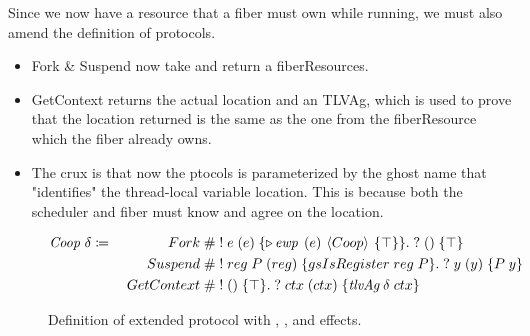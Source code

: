 Since we now have a resource that a fiber must own while running, we must also amend the definition of protocols.

\begin{itemize}
  \item Fork \& Suspend now take and return a fiberResources.
  \item GetContext returns the actual location and an TLVAg, which is used to prove that the location returned is the same as the one from the fiberResource
        which the fiber already owns.
  \item The crux is that now the ptocols \protod{} is parameterized by the ghost name that "identifies" the thread-local variable location.
        This is because both the scheduler and fiber must know and agree on the location. 
\end{itemize}

\begin{figure}[ht]
  \begin{alignat*}{2}
    \protod{} \coloneqq\; &  & \quad Fork\; \#    & \; !\; e\; (e)\; \{\later \ewp{e}{Coop}{\top}\}.\; ?\; ()\; \{ \top \}           \\
                          &  & Suspend\;    \#    & \; !\; reg\; P\; (reg)\; \{gsIsRegister\; reg\; P\}.\; ?\; y\; (y)\; \{ P\; y \} \\
                          &  & GetContext\;    \# & \; !\; ()\; \{\top\}.\; ?\; ctx\; (ctx)\; \{ \gsTLVAg{}\; \delta\; ctx \}
  \end{alignat*}
  \caption{Definition of extended \protod{} protocol with \efork{}, \esuspend{}, and \egetctx{} effects.}
  \label{fig:coop-protocol-ext}
\end{figure}

